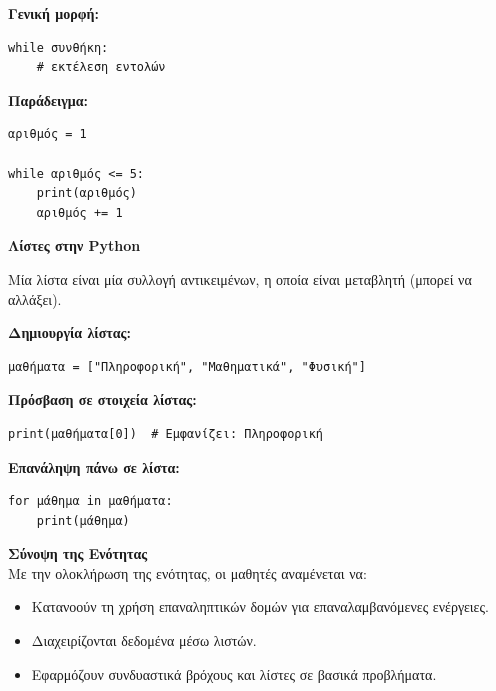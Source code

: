 \documentclass[11pt]{report}
\begin{document}
\textbf{Γενική μορφή:}
\begin{tcolorbox}[colback=gray!5!white, colframe=black!75!black]
\begin{verbatim}
while συνθήκη:
    # εκτέλεση εντολών
\end{verbatim}
\end{tcolorbox}

\textbf{Παράδειγμα:}
\begin{tcolorbox}[colback=gray!5!white, colframe=black!75!black]
\begin{verbatim}
αριθμός = 1

while αριθμός <= 5:
    print(αριθμός)
    αριθμός += 1
\end{verbatim}
\end{tcolorbox}

\vspace{1em}
\textbf{Λίστες στην Python}

Μία λίστα είναι μία συλλογή αντικειμένων, η οποία είναι μεταβλητή (μπορεί να αλλάξει).

\textbf{Δημιουργία λίστας:}
\begin{tcolorbox}[colback=gray!5!white, colframe=black!75!black]
\begin{verbatim}
μαθήματα = ["Πληροφορική", "Μαθηματικά", "Φυσική"]
\end{verbatim}
\end{tcolorbox}

\textbf{Πρόσβαση σε στοιχεία λίστας:}
\begin{tcolorbox}[colback=gray!5!white, colframe=black!75!black]
\begin{verbatim}
print(μαθήματα[0])  # Εμφανίζει: Πληροφορική
\end{verbatim}
\end{tcolorbox}

\textbf{Επανάληψη πάνω σε λίστα:}
\begin{tcolorbox}[colback=gray!5!white, colframe=black!75!black]
\begin{verbatim}
for μάθημα in μαθήματα:
    print(μάθημα)
\end{verbatim}
\end{tcolorbox}

\vspace{1em}
\textbf{Σύνοψη της Ενότητας} \\[0.5em]
Με την ολοκλήρωση της ενότητας, οι μαθητές αναμένεται να:
\begin{itemize}
    \item Κατανοούν τη χρήση επαναληπτικών δομών για επαναλαμβανόμενες ενέργειες.
    \item Διαχειρίζονται δεδομένα μέσω λιστών.
    \item Εφαρμόζουν συνδυαστικά βρόχους και λίστες σε βασικά προβλήματα.
\end{itemize}
\end{document}
